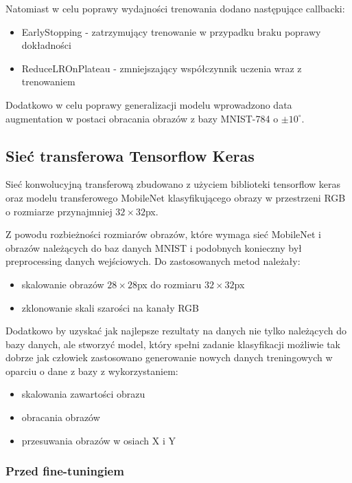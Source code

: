\documentclass{article}
\begin{document}
Natomiast w celu poprawy wydajności trenowania dodano następujące callbacki:

\begin{itemize}
    \item EarlyStopping - zatrzymujący trenowanie w przypadku braku poprawy dokładności
    \item ReduceLROnPlateau - zmniejszający współczynnik uczenia wraz z trenowaniem
\end{itemize}

Dodatkowo w celu poprawy generalizacji modelu wprowadzono data augmentation w
postaci obracania obrazów z bazy MNIST-784 o $\pm10^\circ$.

\subsection{Sieć transferowa Tensorflow Keras}

Sieć konwolucyjną transferową zbudowano z użyciem biblioteki tensorflow 
keras oraz modelu transferowego MobileNet klasyfikującego obrazy w 
przestrzeni RGB o rozmiarze przynajmniej $32\times32$px.

Z powodu rozbieżności rozmiarów obrazów, które wymaga sieć MobileNet 
i obrazów należących do baz danych MNIST i podobnych konieczny był 
preprocessing danych wejściowych. Do zastosowanych metod należały:

\begin{itemize}
\item skalowanie obrazów $28\times28$px do rozmiaru $32\times32$px
\item zklonowanie skali szarości na kanały RGB 
\end{itemize}

Dodatkowo by uzyskać jak najlepsze rezultaty na danych nie tylko 
należących do bazy danych, ale stworzyć model, który spełni zadanie 
klasyfikacji możliwie tak dobrze jak człowiek zastosowano 
generowanie nowych danych treningowych w oparciu o dane z bazy z wykorzystaniem:

\begin{itemize}
\item skalowania zawartości obrazu
\item obracania obrazów
\item przesuwania obrazów w osiach X i Y
\end{itemize}

\subsubsection{Przed fine-tuningiem}
\end{document}
